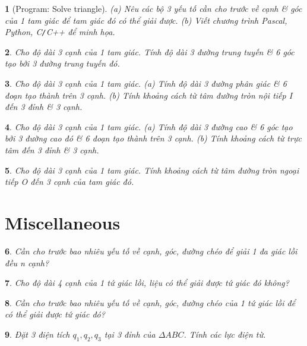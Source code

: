 \documentclass{article}
\newtheorem{baitoan}{}
\begin{document}
\begin{baitoan}[{\sf Program: Solve triangle}]
	(a) Nêu các bộ 3 yếu tố cần cho trước về cạnh \& góc của 1 tam giác để tam giác đó có thể giải được. (b) Viết chương trình {\sf Pascal, Python, C{\tt/}C++} để minh họa.
\end{baitoan}

\begin{baitoan}
	Cho độ dài 3 cạnh của 1 tam giác. Tính độ dài 3 đường trung tuyến \& 6 góc tạo bởi 3 đường trung tuyến đó.
\end{baitoan}

\begin{baitoan}
	Cho độ dài 3 cạnh của 1 tam giác. (a) Tính độ dài 3 đường phân giác \& 6 đoạn tạo thành trên 3 cạnh. (b) Tính khoảng cách từ tâm đường tròn nội tiếp I đến 3 đỉnh \& 3 cạnh.
\end{baitoan}

\begin{baitoan}
	Cho độ dài 3 cạnh của 1 tam giác. (a) Tính độ dài 3 đường cao \& 6 góc tạo bởi 3 đường cao đó \& 6 đoạn tạo thành trên 3 cạnh. (b) Tính khoảng cách từ trực tâm đến 3 đỉnh \& 3 cạnh.
\end{baitoan}

\begin{baitoan}
	Cho độ dài 3 cạnh của 1 tam giác. Tính khoảng cách từ tâm đường tròn ngoại tiếp O đến 3 cạnh của tam giác đó.
\end{baitoan}


\section{Miscellaneous}

\begin{baitoan}
	Cần cho trước bao nhiêu yếu tố về cạnh, góc, đường chéo để giải 1 đa giác lồi đều n cạnh?
\end{baitoan}

\begin{baitoan}
	Cho độ dài 4 cạnh của 1 tứ giác lồi, liệu có thể giải được tứ giác đó không?
\end{baitoan}

\begin{baitoan}
	Cần cho trước bao nhiêu yếu tố về cạnh, góc, đường chéo của 1 tứ giác lồi để có thể giải được tứ giác đó?
\end{baitoan}

\begin{baitoan}
	Đặt 3 điện tích $q_1,q_2,q_3$ tại 3 đỉnh của $\Delta ABC$. Tính các lực điện từ.
\end{baitoan}


\printbibliography[heading=bibintoc]
	
\end{document}
